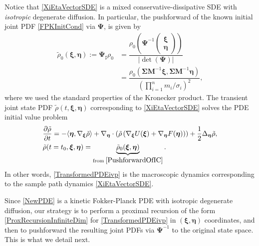 \documentclass[10pt,twocolumn]{IEEEtran}
\begin{document}
Notice that \eqref{XiEtaVectorSDE} is a mixed conservative-dissipative SDE with \emph{isotropic} degenerate diffusion. In particular, the pushforward of the known initial joint PDF \eqref{FPKInitCond} via $\bm{\Psi}$, is given by
\begin{align}
\tilde{\rho}_{0}(\bm{\xi},\bm{\eta}) := \bm{\Psi}_{\sharp} \rho_{0} 
&= \dfrac{\rho_{0}\left(\bm{\Psi}^{-1} \begin{pmatrix}
\bm{\xi}\\
\bm{\eta}	
\end{pmatrix}\right)}{|\det\left(\bm{\Psi}\right)|} \nonumber\\
&= \dfrac{\rho_{0}\left(\bm{\Sigma}\bm{M}^{-1}\bm{\xi},\bm{\Sigma}\bm{M}^{-1}\bm{\eta}\right)}{\left(\displaystyle\prod_{i=1}^{n}m_{i}/\sigma_{i}\right)^{\!2}},
\label{PushforwardOfIC}	
\end{align}
where we used the standard properties of the Kronecker product. The transient joint state PDF $\tilde{\rho}(t,\bm{\xi},\bm{\eta})$ corresponding to \eqref{XiEtaVectorSDE} solves the PDE initial value problem
\begin{subequations}
\begin{align}
&\dfrac{\partial\tilde{\rho}}{\partial t} = -\langle\bm{\eta},\nabla_{\bm{\xi}}\tilde{\rho}\rangle + \nabla_{\bm{\eta}}\cdot\left(\tilde{\rho}\left(\nabla_{\bm{
\xi}}U(\bm{\xi})+\nabla_{\bm{\eta}}F(\bm{\eta})\right)\right) + \dfrac{1}{2}\Delta_{\bm{\eta}}\tilde{\rho}, \label{NewPDE}\\
&\tilde{\rho}(t=t_{0},\bm{\xi},\bm{\eta}) = \underbrace{\tilde{\rho}_{0}(\bm{\xi},\bm{\eta})}_{\text{from}\;\eqref{PushforwardOfIC}}. \label{NewIC}	
\end{align}
\label{TransformedPDEivp}	
\end{subequations}
In other words, \eqref{TransformedPDEivp} is the macroscopic dynamics corresponding to the sample path dynamics \eqref{XiEtaVectorSDE}.

Since \eqref{NewPDE} is a kinetic Fokker-Planck PDE with isotropic degenerate diffusion, our strategy is to perform a proximal recursion of the form \eqref{ProxRecursionInfiniteDim} for \eqref{TransformedPDEivp} in $(\bm{\xi},\bm{\eta})$ coordinates, and then to pushforward the resulting joint PDFs via $\bm{\Psi}^{-1}$ to the original state space. This is what we detail next.
\end{document}
